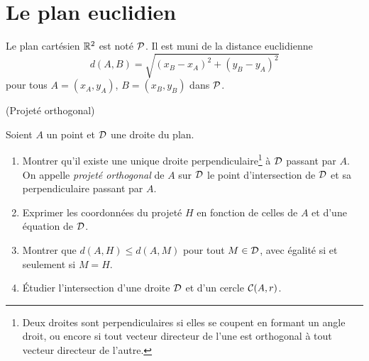\documentclass[a4paper,11pt,reqno]{amsart}
\begin{document}

\section{Le plan euclidien}

\begin{convention}
  Le plan cartésien $\mathbb{R}^2$ est noté $\mathcal{P}$. Il est muni de la distance euclidienne
  \[
    d(A,B)=\sqrt{(x_B-x_A)^2+(y_B-y_A)^2}
  \]
  pour tous $A=(x_A,y_A)$, $B=(x_B,y_B)$ dans $\mathcal{P}$.
\end{convention}


\begin{exo} (Projeté orthogonal)

  Soient $A$ un point et $\mathcal{D}$ une droite du plan.
  \begin{enumerate}
     \item Montrer qu'il existe une unique droite perpendiculaire\footnote{Deux droites sont perpendiculaires si elles se coupent en formant un angle droit, ou encore si tout vecteur directeur de l'une est orthogonal à tout vecteur directeur de l'autre.} à $\mathcal{D}$ passant par $A$. On appelle \emph{projeté orthogonal} de $A$ sur $\mathcal{D}$ le point d'intersection de $\mathcal{D}$ et sa perpendiculaire passant par $A$.
     \item Exprimer les coordonnées du projeté $H$ en fonction de celles de $A$ et d'une équation de $\mathcal{D}$.
     \item Montrer que $d(A,H)\leqslant d(A,M)$ pour tout $M \in \mathcal{D}$, avec égalité si et seulement si $M=H$.
     \item Étudier l'intersection d'une droite $\mathcal{D}$ et d'un cercle $\mathcal{C}(A,r)$.
  \end{enumerate}
\end{exo}
\end{document}
